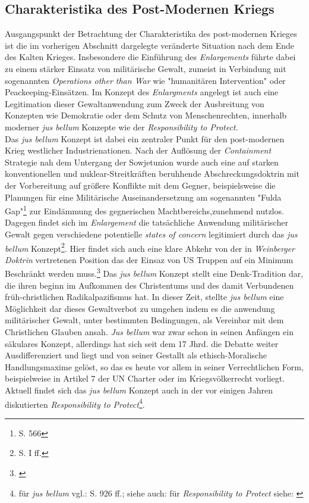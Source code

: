 \documentclass[11pt,a4paper,oneside,numbers=noenddot,bibliography=totocnumbered,DIV=13]{scrartcl}
\begin{document}
\subsection{Charakteristika des Post-Modernen Kriegs}
Ausgangspunkt der Betrachtung der Charakteristika des post-modernen Krieges ist die im vorherigen Abschnitt dargelegte veränderte Situation nach dem Ende des Kalten Krieges. Insbesondere die Einführung des \textit{Enlargements} führte dabei zu einem stärker Einsatz von militärische Gewalt, zumeist in Verbindung mit sogenannten \textit{Operations other than War} wie "humanitären Intervention" oder Peackeeping-Einsätzen. Im Konzept des \textit{Enlargments} angelegt ist auch eine Legitimation dieser Gewaltanwendung zum Zweck der Ausbreitung von Konzepten wie Demokratie oder dem Schutz von Menschenrechten, innerhalb moderner \textit{jus bellum} Konzepte wie der \textit{Responsibility to Protect}.\\
Das \textit{jus bellum} Konzept ist dabei ein zentraler Punkt für den post-modernen Krieg westlicher Industrienationen. Nach der Auflösung der  \textit{Containment} Strategie nah dem Untergang der Sowjetunion wurde auch eine auf starken konventionellen und nuklear-Streitkräften beruhhende Abschreckungsdoktrin mit der Vorbereitung auf größere Konflikte mit dem Gegner, beispielsweise die Planungen für eine Militärische Auseinandersetzung am sogenannten "Fulda Gap"\footnote{\cite{olson_war_2007}S. 566} zur Eindämmung des gegnerischen Machtbereichs,zunehmend nutzlos. Dagegen findet sich im \textit{Enlargement} die tatsächliche Anwendung militärischer Gewalt gegen verschiedene potentielle \textit{states of concern} legitimiert durch das \textit{jus bellum} Konzept\footnote{\cite{DerDerian2001}S. I ff.}. Hier findet sich auch eine klare Abkehr von der in \textit{Weinberger Doktrin} vertretenen Position das der Einsaz von US Truppen auf ein Minimum Beschränkt werden muss.\footnote{\cite{lafeber_rise_2009}}  
Das \textit{jus bellum} Konzept stellt eine Denk-Tradition dar, die ihren beginn im Aufkommen des Christentums und des damit Verbundenen früh-christlichen Radikalpazifismus hat. In dieser Zeit, stellte \textit{jus bellum} eine Möglichkeit dar dieses Gewaltverbot zu umgehen indem es die anwendung militärischer Gewalt, unter bestimmten Bedingungen, als Vereinbar mit dem Christlichen Glauben ansah. \textit{Jus bellum} war zwar schon in seinen Anfängen ein säkulares Konzept, allerdings hat sich seit dem 17 Jhrd. die Debatte weiter Ausdifferenziert und liegt und von seiner Gestallt als ethisch-Moralische Handlungsmaxime gelöst, so das es heute vor allem in seiner Verrechtlichen Form, beispielweise in Artikel 7 der UN Charter oder im Kriegsvölkerrecht vorliegt. Aktuell findet sich das \textit{jus bellum} Konzept auch in der vor einigen Jahren diskutierten \textit{Responsibility to Protect}\footnote{für \textit{jus bellum} vgl.: \cite{2002} S. 926 ff.; siehe auch: \cite{bellamy_responsibilities_2008} für \textit{Responsibility to Protect} siehe: \cite{international_commission_on_intervention_and_state_sovereignty_responsibility_2001}}.\\
\end{document}
